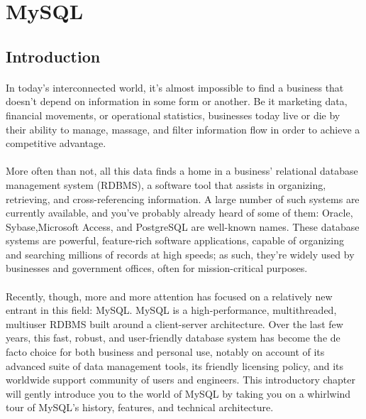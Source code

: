\section{MySQL}
\subsection{Introduction}
\paragraph{}
In today's interconnected world, it's almost impossible to find a business that doesn’t depend on information in some form or another. Be it marketing data, financial movements, or operational statistics, businesses today live or die by their ability to manage, massage, and filter information flow in order to achieve a competitive advantage.

\paragraph{}
More often than not, all this data finds a home in a business’ relational database management system (RDBMS), a software tool that assists in organizing, retrieving, and cross-referencing information. A large number of such systems are currently available, and you’ve probably already heard of some of them: Oracle, Sybase,Microsoft Access, and PostgreSQL are well-known names. These database systems are powerful, feature-rich software applications, capable of organizing and searching millions of records at high speeds; as such, they’re widely used by businesses and government offices, often for mission-critical purposes.

\paragraph{}
Recently, though, more and more attention has focused on a relatively new entrant in this field: MySQL. MySQL is a high-performance, multithreaded, multiuser RDBMS built around a client-server architecture. Over the last few years, this fast, robust, and user-friendly database system has become the de facto choice for both business and personal use, notably on account of its advanced suite of data management tools, its friendly licensing policy, and its worldwide support community of users and engineers. This introductory chapter will gently introduce you to the world of MySQL by taking you on a whirlwind tour of MySQL’s history, features, and technical architecture.

